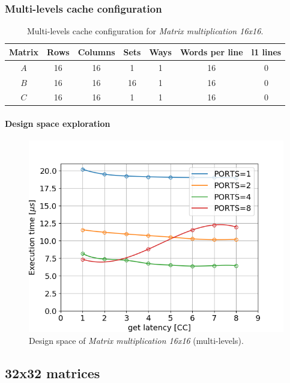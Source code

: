 \documentclass[11pt,a4paper,oneside]{memoir}
\begin{document}
\subsubsection{Multi-levels cache configuration}
\begin{table}[!htb]
	\begin{center}
		\begin{tabular}{ccccccc}
			\hline
			\rowcolor{gray!50}
			\textbf{Matrix} & \textbf{Rows} & \textbf{Columns} &
			\textbf{Sets} & \textbf{Ways} & \textbf{Words per line} &
			\textbf{\ac{l1} lines} \\
			\hline
			$A$ & 16 & 16 & 1 & 1 & 16 & 0 \\
			\rowcolor{gray!25}
			$B$ & 16 & 16 & 16 & 1 & 16 & 0 \\
			$C$ & 16 & 16 & 1 & 1 & 16 & 0 \\
			\hline
		\end{tabular}
	\end{center}
	\caption{Multi-levels cache configuration for \emph{Matrix
	multiplication 16x16}.}
	\label{tab:matmul_16_l1_config}
\end{table}

\paragraph{Design space exploration}
\begin{figure}[!htb]
	\centering
	\includegraphics[width=.8\textwidth]{matmul_16_multiport_L1_latency}
	\caption{Design space of \emph{Matrix multiplication 16x16}
	(multi-levels).}
	\label{fig:matmul_16_l1_space}
\end{figure}

\subsection{32x32 matrices}
\end{document}
